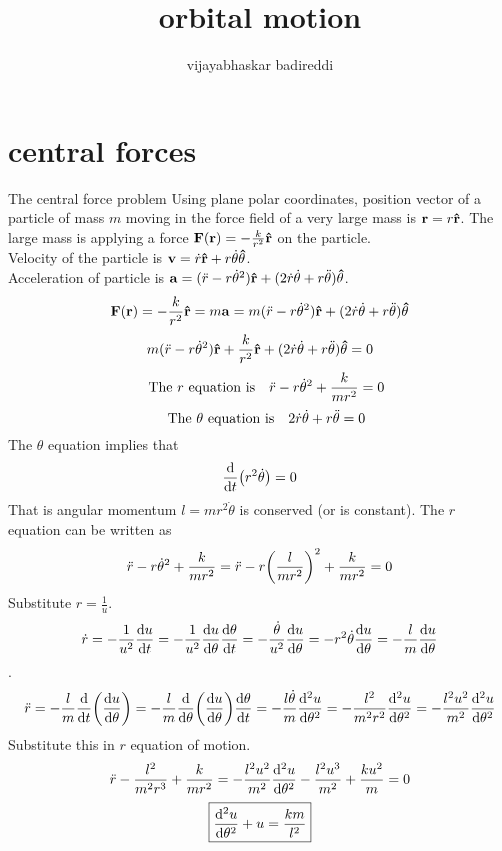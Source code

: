 \documentclass[12pt]{article}
\title{orbital motion}
\author{vijayabhaskar badireddi}
\begin{document}

\section*{central forces}
The central force problem
Using plane polar coordinates, position vector of a particle of mass $m$ moving in the force field of a very large mass is $\vb{r}=r\vu{r}$. The large mass is applying a force $\vb{F}(\vb{r})=-\frac{k}{r^2}\vu{r}$ on the particle.\\
Velocity of the particle is $\vb{v}=\dot{r}\vu{r}+r\dot{\theta}\vu{\theta}$.\\
Acceleration of particle is $\vb{a}=(\ddot{r}-r\dot{\theta}^2)\vu{r}+(2\dot{r}\dot{\theta}+r\ddot{\theta})\vu{\theta}$.
\[\vb{F}(\vb{r})=-\frac{k}{r^2}\vu{r}=m\vb{a}=m(\ddot{r}-r\dot{\theta}^2)\vu{r}+(2\dot{r}\dot{\theta}+r\ddot{\theta})\vu{\theta}\]
\[m(\ddot{r}-r\dot{\theta}^2)\vu{r}+\frac{k}{r^2}\vu{r}+(2\dot{r}\dot{\theta}+r\ddot{\theta})\vu{\theta}=0\]
\[\qq{The $r$ equation is} \ddot{r}-r\dot{\theta}^2+\frac{k}{mr^2} =0\]
\[\qq{The $\theta$ equation is} 2\dot{r}\dot{\theta}+r\ddot{\theta}=0\]
The $\theta$ equation implies that \[\dv{t}(r^2\dot{\theta})=0\]
That is angular momentum $l=mr^2\dot{\theta}$ is conserved (or is constant).
The $r$ equation can be written as \[\ddot{r}-r\dot{\theta}^2+\frac{k}{mr^2}=\ddot{r}-r\qty(\frac{l}{mr^2})^2+\frac{k}{mr^2}=0\]
Substitute $r=\frac{1}{u}$.
\[\dot{r}=-\frac{1}{u^2}\dv{u}{t}=-\frac{1}{u^2}\dv{u}{\theta}\dv{\theta}{t}=-\frac{\dot{\theta}}{u^2}\dv{u}{\theta}=-r^2\dot{\theta}\dv{u}{\theta}=-\frac{l}{m}\dv{u}{\theta}\].
\[\ddot{r}=-\frac{l}{m}\dv{t}\qty(\dv{u}{\theta})=-\frac{l}{m}\dv{\theta}\qty(\dv{u}{\theta})\dv{\theta}{t}=-\frac{l\dot{\theta}}{m}\dv[2]{u}{\theta}=-\frac{l^2}{m^2r^2}\dv[2]{u}{\theta}=-\frac{l^2u^2}{m^2}\dv[2]{u}{\theta}\]
Substitute this in $r$ equation of motion.
\[\ddot{r}-\frac{l^2}{m^2r^3}+\frac{k}{mr^2}=-\frac{l^2u^2}{m^2}\dv[2]{u}{\theta}-\frac{l^2u^3}{m^2}+\frac{ku^2}{m}=0\]
\[\boxed{\dv[2]{u}{\theta}+u=\frac{km}{l^2}}\]
\end{document}
